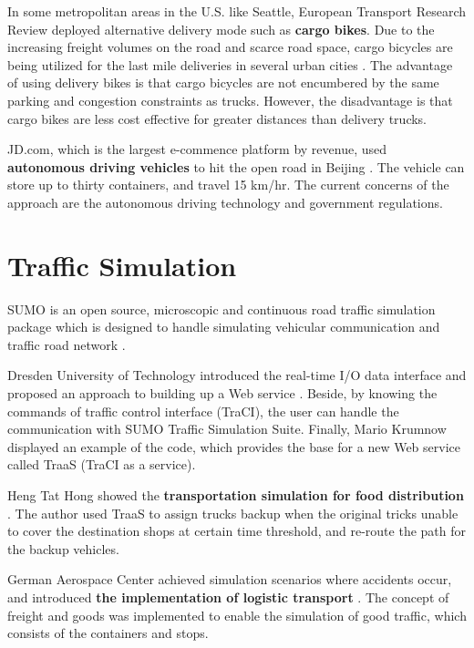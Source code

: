 \documentclass[12pt]{ksthesis}
\begin{document}
\begin{thesis}
{%
In some metropolitan areas in the U.S. like Seattle, European Transport Research Review deployed alternative delivery mode such as \textbf{cargo bikes}\cite{Sheth2019}. Due to the increasing freight volumes on the road and scarce road space, cargo bicycles are being utilized for the last mile deliveries in several urban cities \cite{Melo2017}. The advantage of using delivery bikes is that cargo bicycles are not encumbered by the same parking and congestion constraints as trucks. However, the disadvantage is that cargo bikes are less cost effective for greater distances than delivery trucks.

JD.com, which is the largest e-commence platform by revenue, used \textbf{autonomous driving vehicles} to hit the open road in Beijing \cite{xia2018last}. The vehicle can store up to thirty containers, and travel 15 km/hr. The current concerns of the approach are the autonomous driving technology and government regulations.

\section{Traffic Simulation}
SUMO is an open source, microscopic and continuous road traffic simulation package which is designed to  handle simulating vehicular communication and traffic road network \cite{behrisch2011sumo}.

Dresden University of Technology introduced the real-time I/O data interface and proposed an approach to building up a Web service \cite{10.1007/978-3-662-45079-6_5}. 
Beside, by knowing the commands of traffic control interface (TraCI), the user can handle the communication with SUMO Traffic Simulation Suite. Finally, Mario Krumnow displayed an example of the code, which provides the base for a new Web service called TraaS (TraCI as a service).

Heng Tat Hong showed the \textbf{transportation simulation for food distribution} \cite{hong2016intelligent}. The author used TraaS to assign trucks backup when the original tricks unable to cover the destination shops at certain time threshold, and re-route the path for the backup vehicles.

German Aerospace Center achieved simulation scenarios where accidents occur, and introduced \textbf{the implementation of logistic transport} \cite{Kendziorra2015}. The concept of freight and goods was implemented to enable the simulation of good traffic, which consists of the containers and stops.



}
\end{thesis}
\end{document}
